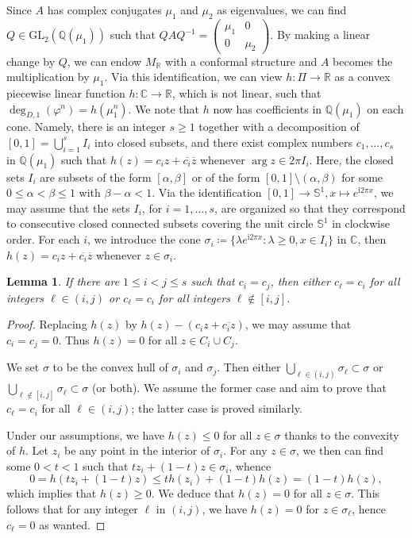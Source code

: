 \documentclass[11pt,a4paper]{article}
\theoremstyle{plain}
\newtheorem{lemma}[theorem]{Lemma}
\theoremstyle{remark}
\theoremstyle{custombold}
\newcommand{\irm}{\mathrm{i}}
\begin{document}
Since $A$ has complex conjugates $\mu_1$ and $\mu_2$ as eigenvalues, we can find $Q\in\mathrm{GL}_2(\mathbb Q(\mu_1))$ such that $QAQ^{-1}=\begin{pmatrix}
    \mu_1&0\\0&\mu_2
\end{pmatrix}$. By making a linear change by $Q$, we can endow $M_\mathbb R$ with a conformal structure and $A$ becomes the multiplication by $\mu_1$. Via this identification, we can view $h\colon\Pi\rightarrow\mathbb R$ as a convex piecewise linear function $h\colon \mathbb C\rightarrow\mathbb R$, which is not linear, such that $\deg_{D,1}(\varphi^n)=h(\mu_1^n)$. We note that $h$ now has coefficients in $\mathbb Q(\mu_1)$ on each cone. Namely, there is an integer $s\geq1$ together with a decomposition of $[0,1]=\bigcup_{i=1}^sI_i$ into closed subsets, and there exist complex numbers $c_1,\ldots,c_s$ in $\mathbb Q(\mu_1)$ such that $h(z)=c_iz+\overline{c_i}\overline{z}$ whenever $\arg z\in 2\pi I_i$. Here, the closed sets $I_i$ are subsets of the form $[\alpha,\beta]$ or of the form  $[0,1]\setminus(\alpha,\beta)$ for some $0\leq \alpha<\beta\leq 1$ with $\beta-\alpha<1$. Via the identification $[0,1]\rightarrow\mathbb S^1,x\mapsto e^{\irm2\pi x}$, we may assume that the sets $I_i$, for $i=1,\ldots,s$, are organized so that they correspond to consecutive closed connected subsets covering the unit circle $\mathbb S^1$ in clockwise order. For each $i$, we introduce the cone $\sigma_i\coloneqq \{\lambda e^{\irm 2\pi x}:\lambda\geq0,x\in I_i\}$ in $\mathbb C$, then $h(z)=c_iz+\overline{c_i}\overline{z}$ whenever  $ z\in \sigma_i$.

\begin{lemma}\label{convex+linear implies strictly convex}
    If there are $1\leq i< j\leq s$ such that $c_i=c_j$, then either $c_{\ell}=c_i$ for all integers $\ell\in (i,j)$ or $c_{\ell}=c_i$ for all integers $\ell\not\in[i,j]$.
\end{lemma}
\begin{proof}
Replacing $h(z)$ by $h(z)-(c_iz+\overline{c_iz})$, we may assume that $c_i=c_j=0$. Thus $h(z)=0$ for all $z\in C_i\cup C_j$. 

We set $\sigma$ to be the convex hull of $\sigma_i$ and $\sigma_j$. Then either $\bigcup_{ \ell\in (i,j)}\sigma_{\ell}\subset \sigma$ or $\bigcup_{ \ell\not\in [i,j]}\sigma_{\ell}\subset \sigma$ (or both). We assume the former case and aim to prove that $c_{\ell}=c_i$ for all $\ell\in (i,j)$; the latter case is proved similarly.

Under our assumptions, we have $h(z)\leq 0$ for all $z\in \sigma$ thanks to the convexity of $h$. Let $z_i$ be any point in the interior of $\sigma_i$. For any $z\in \sigma$, we then can find some $0<t<1$ such that $tz_i+(1-t)z\in \sigma_i$, whence 
$$0=h(tz_i+(1-t)z)\leq th(z_i)+(1-t)h(z)=(1-t)h(z),$$
which implies that $ h(z)\geq0$. We deduce that $h(z)=0$ for all $z\in\sigma$. This follows that for any integer $\ell$ in $(i,j)$, we have $h(z)=0$ for $z\in \sigma_{\ell}$, hence $c_{\ell}=0$ as wanted.
\end{proof}
\end{document}
